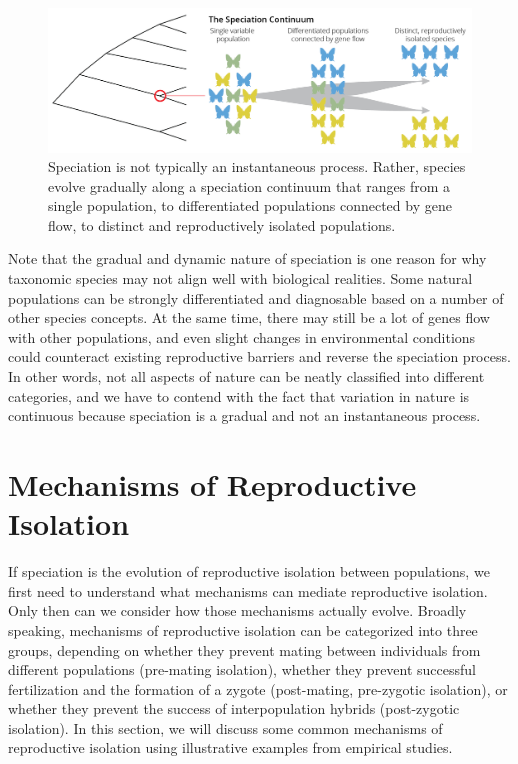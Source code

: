 \documentclass[
]{book}
\begin{document}
\begin{figure}
\includegraphics[width=1\linewidth]{images/speciation_continuum} \caption{Speciation is not typically an instantaneous process. Rather, species evolve gradually along a speciation continuum that ranges from a single population, to differentiated populations connected by gene flow, to distinct and reproductively isolated populations.}\label{fig:speccont2}
\end{figure}

Note that the gradual and dynamic nature of speciation is one reason for why taxonomic species may not align well with biological realities. Some natural populations can be strongly differentiated and diagnosable based on a number of other species concepts. At the same time, there may still be a lot of genes flow with other populations, and even slight changes in environmental conditions could counteract existing reproductive barriers and reverse the speciation process. In other words, not all aspects of nature can be neatly classified into different categories, and we have to contend with the fact that variation in nature is continuous because speciation is a gradual and not an instantaneous process.

\hypertarget{mechanisms-of-reproductive-isolation}{%
\section{Mechanisms of Reproductive Isolation}\label{mechanisms-of-reproductive-isolation}}

If speciation is the evolution of reproductive isolation between populations, we first need to understand what mechanisms can mediate reproductive isolation. Only then can we consider how those mechanisms actually evolve. Broadly speaking, mechanisms of reproductive isolation can be categorized into three groups, depending on whether they prevent mating between individuals from different populations (pre-mating isolation), whether they prevent successful fertilization and the formation of a zygote (post-mating, pre-zygotic isolation), or whether they prevent the success of interpopulation hybrids (post-zygotic isolation). In this section, we will discuss some common mechanisms of reproductive isolation using illustrative examples from empirical studies.
\end{document}
